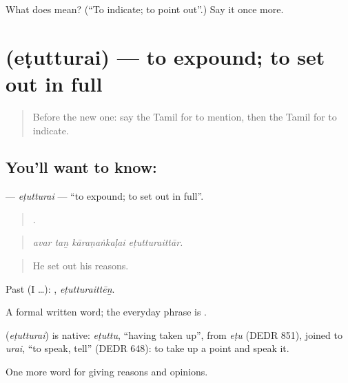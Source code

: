 \begin{tcolorbox}[breakable,colback=teal!4,colframe=teal!35!black,title={Before you move on}]
What does  mean? (\textquotedblleft{}To indicate; to point out\textquotedblright{}.) Say it once more.
\end{tcolorbox}
\section[\texorpdfstring{\ta{எடுத்துரை} (eṭutturai)}{எடுத்துரை (eṭutturai)}]{ (eṭutturai) — to expound; to set out in full}

\label{lesson:TA-C351-etutturai}



\begin{quote}
Before the new one: say the Tamil for to mention, then the Tamil for to indicate.
\end{quote}

\subsection*{You'll want to know: }
\textbf{} — \emph{eṭutturai} — \textquotedblleft{}to expound; to set out in full\textquotedblright{}.

\begin{quote}
   .
\end{quote}

\begin{quote}
\emph{avar taṉ kāraṇaṅkaḷai eṭutturaittār.}
\end{quote}

\begin{quote}
He set out his reasons.
\end{quote}

Past (I …): , \emph{eṭutturaittēṉ}.

A formal written word; the everyday phrase is  .

\begin{cousinweb}
\textbf{} (\emph{eṭutturai}) is native: \emph{eṭuttu}, \textquotedblleft{}having taken up\textquotedblright{}, from \emph{eṭu} (DEDR 851), joined to \emph{urai}, \textquotedblleft{}to speak, tell\textquotedblright{} (DEDR 648): to take up a point and speak it.
\end{cousinweb}

\begin{grammarlens}[title={What you've built}]
One more word for giving reasons and opinions.
\end{grammarlens}

